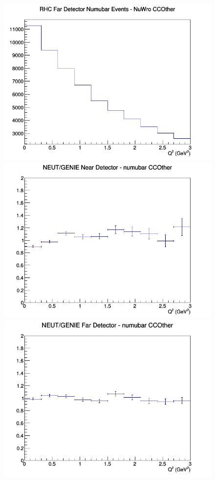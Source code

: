 \documentclass[12pt]{article}
\begin{document}
\begin{figure}[h]
\endminipage
{}
\includegraphics[width=\linewidth]{eff_Q2/GAr/CCOther_RHC_FD_numubar_Q2_NuWro.png}
\endminipage
\newline
{}
\includegraphics[width=\linewidth]{eff_Q2/GAr/ratios/CCOther_NEUT_GENIE_numubar_near_Q2.png}
\endminipage
{}
\includegraphics[width=\linewidth]{eff_Q2/GAr/ratios/CCOther_NEUT_GENIE_numubar_far_Q2.png}

\end{figure}
\end{document}
